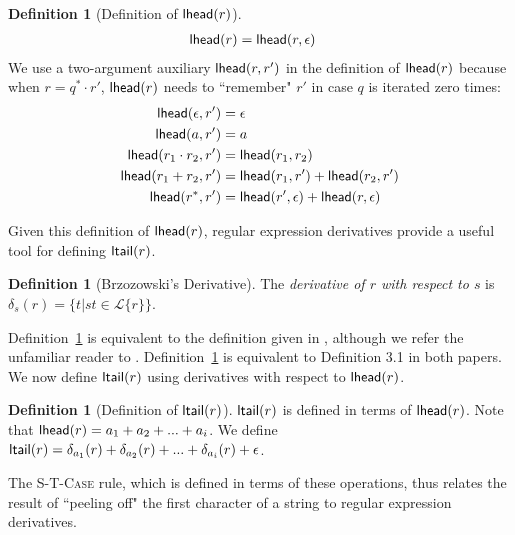 \documentclass[10pt]{sigplanconf}
\theoremstyle{definition}
\newtheorem{defn}[thm]{Definition}
\newcommand{\Lagr}{\mathcal{L}}
\newcommand{\lang}[1]{\Lagr\{#1\}}
\newcommand{\lhead}[1]{ {\sf lhead}(#1) }
\newcommand{\ltail}[1]{ {\sf ltail}(#1) }
\begin{document}
\begin{defn}[Definition of $\lhead{r}$] 
{\footnotesize
\begin{align*}
\lhead{r}                 &= \lhead{r, \epsilon}
\end{align*}}We use a two-argument auxiliary $\lhead{r, r'}$ in the definition of $\lhead{r}$ because when $r = q^*\cdot r'$,
$\lhead{r}$ needs to ``remember" $r'$ in case $q$ is iterated zero times:
{\footnotesize
\begin{align*}
\lhead{\epsilon, r'}      &= \epsilon \\                                        
\lhead{a, r'}             &= a \\                                               
\lhead{r_1\cdot r_2, r'}  &= \lhead{r_1, r_2} \\                                
\lhead{r_1 + r_2, r'}     &= \lhead{r_1, r'} + \lhead{r_2, r'} \\               
\lhead{r^*, r'}           &= \lhead{r', \epsilon} + \lhead{r, \epsilon}         
\end{align*}} 
\end{defn}

Given this definition of $\lhead{r}$, regular expression derivatives \cite{bowzer} provide a useful tool for defining $\ltail{r}$.
\begin{defn}[Brzozowski's Derivative]\label{def:derivative}
  The \emph{derivative of $r$ with respect to $s$} 
  is $\delta_s(r) = \{t | st \in \lang{r}\}$.
\end{defn}

Definition~\ref{def:derivative} is equivalent to the definition given in \cite{bowzer},
although we refer the unfamiliar reader to \cite{owens}.
Definition~\ref{def:derivative} is equivalent to Definition 3.1 in both papers.
We now define $\ltail{r}$ using derivatives with respect to $\lhead{r}$.

\begin{defn}[Definition of $\ltail{r}$]
$\ltail{r}$ is defined in terms of $\lhead{r}$.
Note that $\lhead{r} = a_1 + a_2 + ... + a_i$.
We define $\ltail{r} = \delta_{a_1}(r) + \delta_{a_2}(r) + ... + \delta_{a_i}(r) + \epsilon$.
\end{defn}

The \textsc{S-T-Case} rule, which is defined in terms of these operations, thus relates the result of ``peeling off" the first character of a string to regular expression derivatives. 
\end{document}
